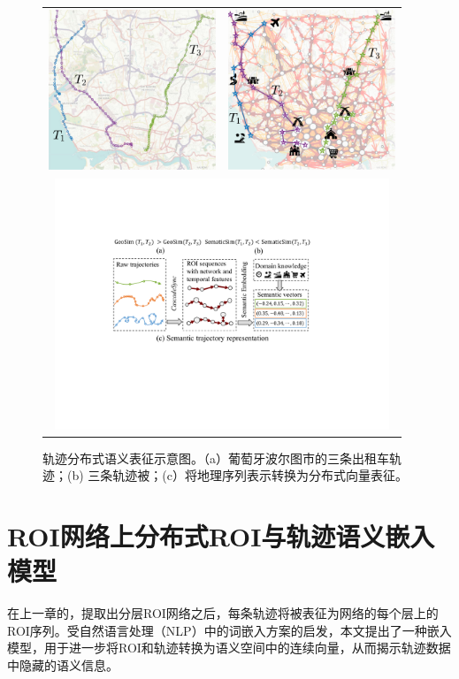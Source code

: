 \tabcolsep=0.5pt
\begin{figure}[!htb]
\centering
\begin{tabular}{cc}
\includegraphics[width=50mm]{pics/introduction1.pdf} & \includegraphics[width=50mm]{pics/introduction2_w.pdf}\\
\multicolumn{2}{c}{\includegraphics[width=100mm]{pics/introduction.pdf}}
\end{tabular}
\caption {轨迹分布式语义表征示意图。（a）葡萄牙波尔图市的三条出租车轨迹；(b) 三条轨迹被；(c）将地理序列表示转换为分布式向量表征。}
\label{fig:introduction}
\end{figure}


\section{ROI网络上分布式ROI与轨迹语义嵌入模型}
在上一章的，提取出分层ROI网络之后，每条轨迹将被表征为网络的每个层上的ROI序列。受自然语言处理（NLP）中的词嵌入方案的启发，本文提出了一种嵌入模型，用于进一步将ROI和轨迹转换为语义空间中的连续向量，从而揭示轨迹数据中隐藏的语义信息。

